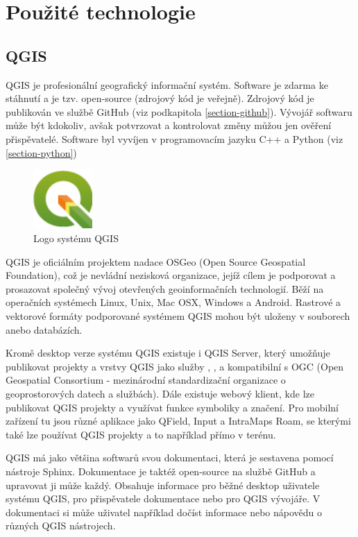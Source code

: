 \chapter{Použité technologie}
\label{4-technologie}

\section{QGIS}

QGIS je profesionální geografický informační systém.
Software je zdarma ke stáhnutí a je tzv. open-source (zdrojový kód je veřejně).
Zdrojový kód je publikován ve službě GitHub (viz podkapitola \ref{section-github}).
Vývojář softwaru může být kdokoliv, avšak potvrzovat a kontrolovat změny můžou jen ověření
přispěvatelé. Software byl vyvíjen v programovacím jazyku C++ a Python (viz \ref{section-python})

\begin{figure}[H] \centering
    \includegraphics[width=64pt]{./pictures/qgis-logo.png}
    \caption[Logo systému QGIS]{Logo systému QGIS \cite{qgis}}
	\label{fig:qgis-logo}                                
\end{figure}

QGIS je oficiálním projektem nadace OSGeo (Open Source Geospatial Foundation), což je nevládní 
nezisková organizace, jejíž cílem je podporovat a prosazovat společný vývoj otevřených geoinformačních
technologií. Běží na operačních systémech Linux, Unix, Mac OSX, Windows a Android.
Rastrové a vektorové formáty podporované systémem QGIS mohou být uloženy v souborech anebo databázích.


Kromě desktop verze systému QGIS existuje i QGIS Server, který umožňuje publikovat projekty a vrstvy
QGIS jako služby , ,  a  kompatibilní s OGC (Open Geospatial Consortium - mezinárodní standardizační organizace
o geoprostorových datech a službách). Dále existuje webový klient, kde lze publikovat
QGIS projekty a využívat funkce symboliky a značení. Pro mobilní zařízení tu jsou
různé aplikace jako QField, Input a IntraMaps Roam, se kterými také lze používat QGIS projekty a to 
například přímo v terénu. 


QGIS má jako většina softwarů svou dokumentaci, která je sestavena pomocí nástroje Sphinx. 
Dokumentace je taktéž open-source na službě GitHub a upravovat ji může každý. Obsahuje
informace pro běžné desktop uživatele systému QGIS, pro přispěvatele dokumentace nebo pro QGIS
vývojáře. V dokumentaci si může uživatel například dočíst informace nebo nápovědu o různých
QGIS nástrojech.

